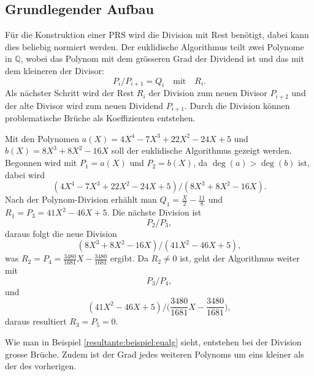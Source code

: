 \subsection{Grundlegender Aufbau
\label{resultante:subsection:aufbau}}
Für die Konstruktion einer PRS wird die Division mit Rest benötigt,
dabei kann dies beliebig normiert werden.
Der euklidische Algorithmus teilt zwei Polynome in \(\mathbb{Q}\),
wobei das Polynom mit dem grösseren Grad der Dividend ist und das mit
dem kleineren der Divisor:
\begin{equation}
    P_i / P_{i+1} = Q_i \quad \text{mit}\quad R_i.
\end{equation}
Als nächster Schritt wird der Rest \(R_i\) der Division zum neuen Divisor
\(P_{i+2}\) und der alte Divisor wird zum neuen Dividend \(P_{i+1}\).
Durch die Division können problematische Brüche als Koeffizienten entstehen.
\begin{beispiel}
    Mit den Polynomen \(a(X)=4X^4-7X^3+22X^2-24X+5\) und
    \(b(X)=8X^3+8X^2-16X\) soll der euklidische Algorithmus gezeigt
    werden.
    Begonnen wird mit \(P_1=a(X)\) und \(P_2=b(X)\), da
    \(\deg(a)>\deg(b)\) ist, dabei wird
    \begin{equation}
        (4X^4-7X^3+22X^2-24X+5)/(8X^3+8X^2-16X).
    \end{equation}
    Nach der Polynom-Division erhählt man
    \(Q_1=\frac{X}{2}-\frac{11}{8}\) und \(R_1=P_3=41X^2-46X+5\).
    Die nächste Division ist
    \begin{equation*}
        P_2/P_3,
    \end{equation*}
    daraus folgt die neue Division
    \begin{equation}
        (8X^3+8X^2-16X)/(41X^2-46X+5),
    \end{equation}
    was \(R_2=P_4=\frac{3480}{1681}X-\frac{3480}{1681}\) ergibt.
    Da \(R_2\neq0\) ist, geht der Algorithmus weiter mit
    \begin{equation*}
        P_3/P_4,
    \end{equation*}
    und
    \begin{equation}
        (41X^2-46X+5)\Big/\biggl(\frac{3480}{1681}X-\frac{3480}{1681}\biggr),
    \end{equation}
    daraus resultiert \(R_3=P_5=0\).
    \label{resultante:beispiel:eualg}
\end{beispiel}
Wie man in Beispiel \ref{resultante:beispiel:eualg} sieht, entstehen
bei der Division grosse Brüche.
Zudem ist der Grad jedes weiteren Polynoms um eins kleiner als der
des vorherigen.

